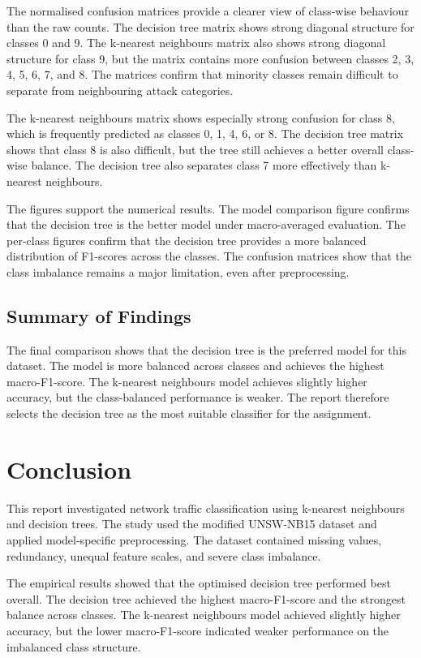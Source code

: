 \documentclass[conference,10pt]{IEEEtran}
\begin{document}
The normalised confusion matrices provide a clearer view of class-wise behaviour than the raw counts. The decision tree matrix shows strong diagonal structure for classes 0 and 9. The k-nearest neighbours matrix also shows strong diagonal structure for class 9, but the matrix contains more confusion between classes 2, 3, 4, 5, 6, 7, and 8. The matrices confirm that minority classes remain difficult to separate from neighbouring attack categories.

The k-nearest neighbours matrix shows especially strong confusion for class 8, which is frequently predicted as classes 0, 1, 4, 6, or 8. The decision tree matrix shows that class 8 is also difficult, but the tree still achieves a better overall class-wise balance. The decision tree also separates class 7 more effectively than k-nearest neighbours.

The figures support the numerical results. The model comparison figure confirms that the decision tree is the better model under macro-averaged evaluation. The per-class figures confirm that the decision tree provides a more balanced distribution of F1-scores across the classes. The confusion matrices show that the class imbalance remains a major limitation, even after preprocessing.

\subsection{Summary of Findings}
The final comparison shows that the decision tree is the preferred model for this dataset. The model is more balanced across classes and achieves the highest macro-F1-score. The k-nearest neighbours model achieves slightly higher accuracy, but the class-balanced performance is weaker. The report therefore selects the decision tree as the most suitable classifier for the assignment.

\section{Conclusion}
This report investigated network traffic classification using k-nearest neighbours and decision trees. The study used the modified UNSW-NB15 dataset and applied model-specific preprocessing. The dataset contained missing values, redundancy, unequal feature scales, and severe class imbalance.

The empirical results showed that the optimised decision tree performed best overall. The decision tree achieved the highest macro-F1-score and the strongest balance across classes. The k-nearest neighbours model achieved slightly higher accuracy, but the lower macro-F1-score indicated weaker performance on the imbalanced class structure.
\end{document}
